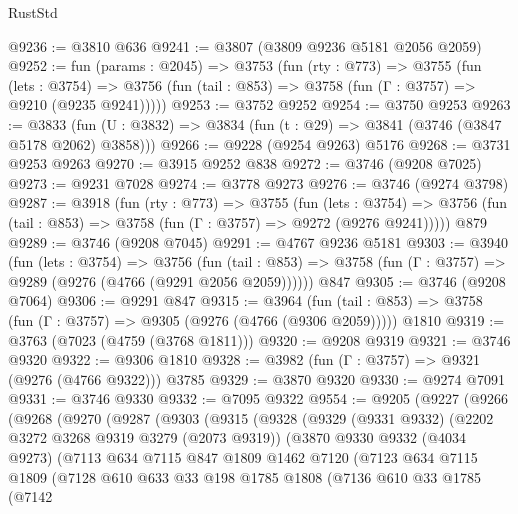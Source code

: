 \begin{lexlean}{RustStd}
\begin{coremodule}
@9236 := @3810 @636
@9241 := @3807 (@3809 @9236 @5181 @2056 @2059)
@9252 := fun (params : @2045) =>
  @3753
    (fun (rty : @773) =>
    @3755
      (fun (lets : @3754) =>
      @3756 (fun (tail : @853) => @3758 (fun (Γ : @3757) => @9210 (@9235 @9241)))))
@9253 := @3752 @9252
@9254 := @3750 @9253
@9263 := @3833 (fun (U : @3832) => @3834 (fun (t : @29) => @3841 (@3746 (@3847 @5178 @2062) @3858)))
@9266 := @9228 (@9254 @9263) @5176
@9268 := @3731 @9253 @9263
@9270 := @3915 @9252 @838
@9272 := @3746 (@9208 @7025)
@9273 := @9231 @7028
@9274 := @3778 @9273
@9276 := @3746 (@9274 @3798)
@9287 := @3918
    (fun (rty : @773) =>
    @3755
      (fun (lets : @3754) =>
      @3756 (fun (tail : @853) => @3758 (fun (Γ : @3757) => @9272 (@9276 @9241)))))
    @879
@9289 := @3746 (@9208 @7045)
@9291 := @4767 @9236 @5181
@9303 := @3940
    (fun (lets : @3754) =>
    @3756
      (fun (tail : @853) => @3758 (fun (Γ : @3757) => @9289 (@9276 (@4766 (@9291 @2056 @2059))))))
    @847
@9305 := @3746 (@9208 @7064)
@9306 := @9291 @847
@9315 := @3964
    (fun (tail : @853) => @3758 (fun (Γ : @3757) => @9305 (@9276 (@4766 (@9306 @2059)))))
    @1810
@9319 := @3763 (@7023 (@4759 (@3768 @1811)))
@9320 := @9208 @9319
@9321 := @3746 @9320
@9322 := @9306 @1810
@9328 := @3982 (fun (Γ : @3757) => @9321 (@9276 (@4766 @9322))) @3785
@9329 := @3870 @9320
@9330 := @9274 @7091
@9331 := @3746 @9330
@9332 := @7095 @9322
@9554 := @9205
    (@9227
      (@9266
        (@9268
          (@9270
            (@9287
              (@9303
                (@9315
                  (@9328
                    (@9329
                      (@9331 @9332)
                      (@2202 @3272 @3268 @9319 @3279 (@2073 @9319))
                      (@3870
                        @9330
                        @9332
                        (@4034 @9273)
                        (@7113
                          @634
                          @7115
                          @847
                          @1809
                          @1462
                          @7120
                          (@7123
                            @634
                            @7115
                            @1809
                            (@7128
                              @610
                              @633
                              @33
                              @198
                              @1785
                              @1808
                              (@7136
                                @610
                                @33
                                @1785
                                (@7142

\end{coremodule}
\end{lexlean}
